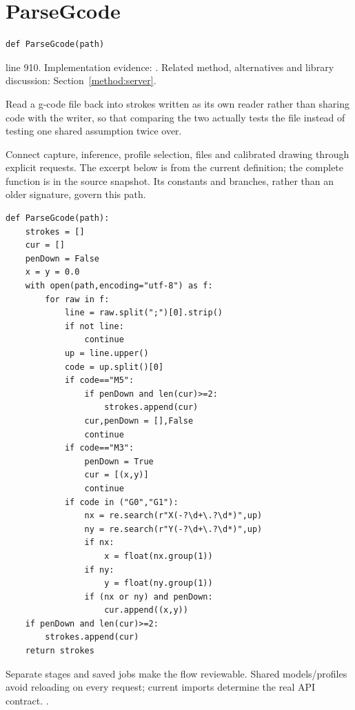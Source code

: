 \section{ParseGcode}\label{fn:web-server:ParseGcode}
\begin{lstlisting}[style=sig]
def ParseGcode(path)
\end{lstlisting}
 line 910. Implementation evidence: \cite{code2026}. Related method, alternatives and library discussion: Section~\ref{method:server}.


Read a g-code file back into strokes written as its own reader rather than sharing code with the writer, so that comparing the two actually tests the file instead of testing one shared assumption twice over.


Connect capture, inference, profile selection, files and calibrated drawing through explicit requests. The excerpt below is from the current definition; the complete function is in the source snapshot. Its constants and branches, rather than an older signature, govern this path.


\begin{lstlisting}[style=plain]
def ParseGcode(path):
    strokes = []
    cur = []
    penDown = False
    x = y = 0.0
    with open(path,encoding="utf-8") as f:
        for raw in f:
            line = raw.split(";")[0].strip()
            if not line:
                continue
            up = line.upper()
            code = up.split()[0]
            if code=="M5":
                if penDown and len(cur)>=2:
                    strokes.append(cur)
                cur,penDown = [],False
                continue
            if code=="M3":
                penDown = True
                cur = [(x,y)]
                continue
            if code in ("G0","G1"):
                nx = re.search(r"X(-?\d+\.?\d*)",up)
                ny = re.search(r"Y(-?\d+\.?\d*)",up)
                if nx:
                    x = float(nx.group(1))
                if ny:
                    y = float(ny.group(1))
                if (nx or ny) and penDown:
                    cur.append((x,y))
    if penDown and len(cur)>=2:
        strokes.append(cur)
    return strokes
\end{lstlisting}
Separate stages and saved jobs make the flow reviewable. Shared models/profiles avoid reloading on every request; current imports determine the real API contract. \cite{flaskdocs,pillowops,code2026}.



